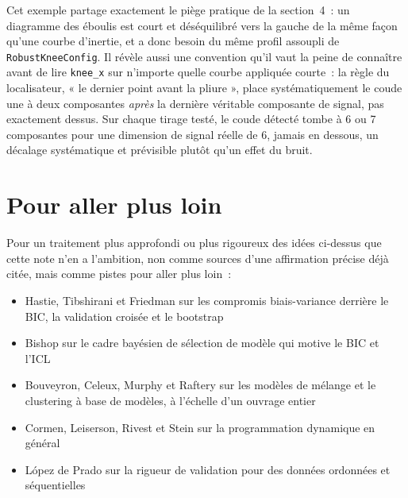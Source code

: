 \documentclass[11pt]{article}
\newcommand{\code}[1]{\texttt{#1}}
\begin{document}
Cet exemple partage exactement le piège pratique de la section~4~: un
diagramme des éboulis est court et déséquilibré vers la gauche de la même
façon qu'une courbe d'inertie, et a donc besoin du même profil assoupli de
\code{RobustKneeConfig}. Il révèle aussi une convention qu'il vaut la peine
de connaître avant de lire \code{knee\_x} sur n'importe quelle courbe
appliquée courte~: la règle du localisateur, « le dernier point avant la
pliure », place systématiquement le coude une à deux composantes
\emph{après} la dernière véritable composante de signal, pas exactement
dessus. Sur chaque tirage testé, le coude détecté tombe à 6 ou 7
composantes pour une dimension de signal réelle de 6, jamais en dessous,
un décalage systématique et prévisible plutôt qu'un effet du bruit.

\section*{Pour aller plus loin}

Pour un traitement plus approfondi ou plus rigoureux des idées ci-dessus
que cette note n'en a l'ambition, non comme sources d'une affirmation
précise déjà citée, mais comme pistes pour aller plus loin~:

\begin{itemize}[leftmargin=*]
\item Hastie, Tibshirani et Friedman sur les compromis biais-variance
  derrière le BIC, la validation croisée et le bootstrap
  \citeyearpar{hastie2009esl}
\item Bishop sur le cadre bayésien de sélection de modèle qui motive le BIC
  et l'ICL \citeyearpar{bishop2006prml}
\item Bouveyron, Celeux, Murphy et Raftery sur les modèles de mélange et le
  clustering à base de modèles, à l'échelle d'un ouvrage entier
  \citeyearpar{bouveyron2021mbc}
\item Cormen, Leiserson, Rivest et Stein sur la programmation dynamique en
  général \citeyearpar{cormen2022algorithms}
\item L\'opez de Prado sur la rigueur de validation pour des données
  ordonnées et séquentielles \citeyearpar{lopezdeprado2018financial}
\end{itemize}


\end{document}
